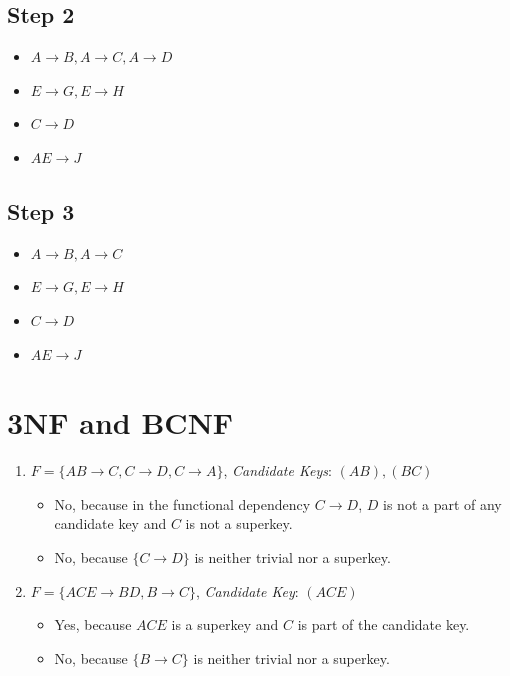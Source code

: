 \documentclass{scrartcl}
\begin{document}
\subsection*{Step 2}
\begin{itemize}
    \item $A \rightarrow B, A \rightarrow C, A \rightarrow D$
    \item $E \rightarrow G, E \rightarrow H$
    \item $C \rightarrow D$
    \item $AE \rightarrow J$
\end{itemize}

\subsection*{Step 3}
\begin{itemize}
    \item $A \rightarrow B, A \rightarrow C$
    \item $E \rightarrow G, E \rightarrow H$
    \item $C \rightarrow D$
    \item $AE \rightarrow J$
\end{itemize}

\section{3NF and BCNF}
\begin{enumerate}
    \item  $F = \{ AB \rightarrow C, C \rightarrow D, C \rightarrow A \}$, \textit{Candidate Keys}: $(AB), (BC)$
    \begin{itemize}
        \item No, because in the functional dependency $C \rightarrow D$, $D$ is not a part of any candidate key and $C$ is not a superkey.
        \item No, because $\{ C \rightarrow D \}$ is neither trivial nor a superkey.
    \end{itemize}
    \item $F = \{ACE \rightarrow BD, B \rightarrow C\}$, \textit{Candidate Key}: $(ACE)$
    \begin{itemize}
        \item Yes, because $ACE$ is a superkey and $C$ is part of the candidate key.
        \item No, because $\{B \rightarrow C \}$ is neither trivial nor a superkey.
    \end{itemize}
\end{enumerate}
\end{document}
